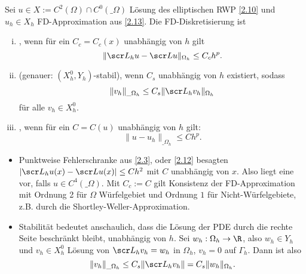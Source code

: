 \begin{df} \label{2.21}
	Sei $u \in X := C^2(\Omega) \cap C^0(\_\Omega)$ Lösung des elliptischen RWP \ref{2.10} und $u_h \in X_h$ FD-Approximation aus \ref{2.13}.
	Die FD-Diskretisierung ist
	\begin{enumerate}[i)]
		\item
			, wenn für ein $C_c = C_c(x)$ unabhängig von $h$ gilt
			\[
				\|\scr L_h u - \scr L u\|_{\Omega_h} \le C_c h^p.
			\]
		\item
			 (genauer: $(X_h^0, Y_h)$-stabil), wenn $C_s$ unabhängig von $h$ existiert, sodass
			\[
				\|v_h\|_{\_\Omega_h} \le C_s \|\scr L_h v_h\|_{\Omega_h}
			\]
			für alle $v_h \in X_h^0$.
		\item
			, wenn für ein $C = C(u)$ unabhängig von $h$ gilt:
			\[
				\|u - u_h\|_{\_\Omega_h} \le C h^p.
			\]
	\end{enumerate}
	\begin{note}
		\begin{itemize}
			\item
				Punktweise Fehlerschranke aus \ref{2.3}, oder \ref{2.12} besagten $|\scr L_h u(x) - \scr L u(x)| \le C h^2$ mit $C$ unabhängig von $x$.
				Also liegt eine  vor, falls $u \in C^4(\_\Omega)$.
				Mit $C_c := C$ gilt Konsistenz der FD-Approximation mit Ordnung 2 für $\Omega$ Würfelgebiet und Ordnung $1$ für Nicht-Würfelgebiete, z.B. durch die Shortley-Weller-Approximation.
		\end{itemize}
	\end{note}
	\begin{note}[Stabilität]
		\begin{itemize}
			\item
				Stabilität bedeutet anschaulich, dass die Lösung der PDE durch die rechte Seite beschränkt bleibt, unabhängig von $h$.
				Sei $w_h: \Omega_h \to \R$, also $w_h \in Y_h$ und $v_h \in X_h^0$ Lösung von $\scr L_h v_h = w_h$ in $\Omega_h$, $v_h = 0$ auf $\Gamma_h$.
				Dann ist also
				\[
					\|v_h\|_{\_\Omega_h} \le C_s \|\scr L_h v_h\| = C_s \|w_h\|_{\Omega_h}.
				\]
		\end{itemize}
	\end{note}
\end{df}

